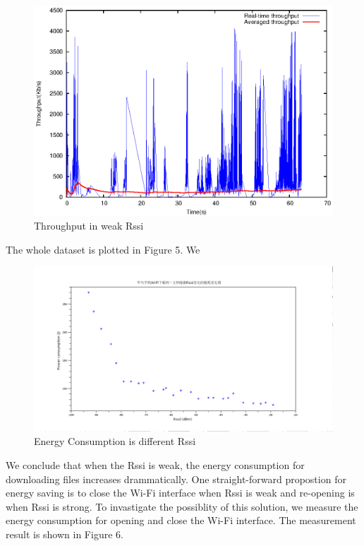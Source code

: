 \documentclass[journal]{IEEEtran}
\begin{document}
\begin{figure}
\centering
\includegraphics[scale=0.55]{weak_traffic.eps}
\caption{Throughput in weak Rssi}
\end{figure}

\indent The whole dataset is plotted in Figure 5. We 

\begin{figure}
\centering
\includegraphics[scale=0.2]{energy_different_rssi.png}
\caption{Energy Consumption is different Rssi}
\end{figure}

\indent We conclude that when the Rssi is weak, the energy consumption for downloading files increases drammatically. 
One straight-forward propostion for energy saving is to close the Wi-Fi interface when Rssi is weak and re-opening is when Rssi 
is strong. To invastigate the possiblity of this solution, 
we measure the energy consumption for opening and close the Wi-Fi interface. The measurement result is shown in Figure 6.
\\
\indent 
\end{document}
